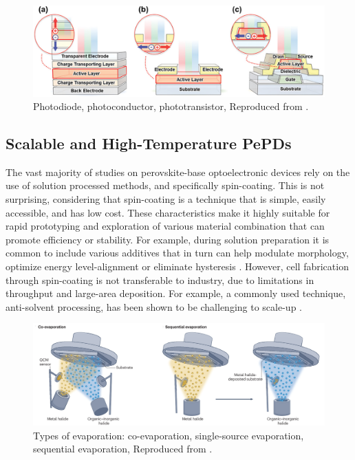 \begin{figure}[htbp]
  \centering
  \medskip
  \includegraphics[width=.9\textwidth]{chapters/introduction/image/types_of_detector.jpg}
  \caption[Short caption for Table of Figures]{Photodiode, photoconductor, phototransistor, Reproduced from \cite{Yoo2021ADirections}.}
  \label{fig:ch2:types_of_detector}
\end{figure}

\subsection{Scalable and High-Temperature PePDs} \label{ch1:scalable_high_temp}


The vast majority of studies on perovskite-base optoelectronic devices rely on the use of solution processed methods, and specifically spin-coating. This is not surprising, considering that spin-coating is a technique that is simple, easily accessible, and has low cost. These characteristics make it highly suitable for rapid prototyping and exploration of various material combination that can promote efficiency or stability. For example, during solution preparation it is common to include various additives that in turn can help modulate morphology, optimize energy level-alignment or eliminate hysteresis \cite{Liu2020ACells}. However, cell fabrication through spin-coating is not transferable to industry, due to limitations in throughput and large-area deposition. For example, a commonly used technique, anti-solvent processing, has been shown to be challenging to scale-up \cite{Saki2021Solution-processedCells}.

\begin{figure}[htbp]
  \centering
  \medskip
  \includegraphics[width=.99\textwidth]{chapters/introduction/image/types_of_evaporation.png}
  \caption[Short caption for Table of Figures]{Types of evaporation: co-evaporation, single-source evaporation, sequential evaporation, Reproduced from \cite{Han2025PerovskiteCells}.}
  \label{fig:ch2:types_of_evaporation}
\end{figure}

